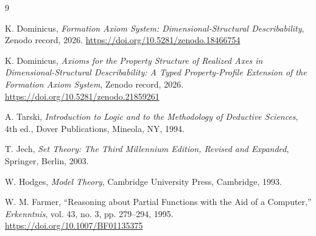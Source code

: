 \documentclass[11pt]{article}
\theoremstyle{definition}
\theoremstyle{remark}
\begin{document}
\begin{thebibliography}{9}

K. Dominicus,
\textit{Formation Axiom System: Dimensional-Structural Describability},
Zenodo record, 2026.
\url{https://doi.org/10.5281/zenodo.18466754}

K. Dominicus,
\textit{Axioms for the Property Structure of Realized Axes in Dimensional-Structural Describability: A Typed Property-Profile Extension of the Formation Axiom System},
Zenodo record, 2026.
\url{https://doi.org/10.5281/zenodo.21859261}

A. Tarski,
\textit{Introduction to Logic and to the Methodology of Deductive Sciences},
4th ed., Dover Publications, Mineola, NY, 1994.

T. Jech,
\textit{Set Theory: The Third Millennium Edition, Revised and Expanded},
Springer, Berlin, 2003.

W. Hodges,
\textit{Model Theory},
Cambridge University Press, Cambridge, 1993.

W. M. Farmer,
``Reasoning about Partial Functions with the Aid of a Computer,''
\textit{Erkenntnis}, vol. 43, no. 3, pp. 279--294, 1995.
\url{https://doi.org/10.1007/BF01135375}

\end{thebibliography}
\end{document}
